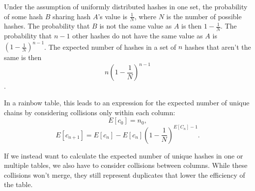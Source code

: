 \documentclass[]{paper}
\begin{document}
Under the assumption of uniformly distributed hashes in one set, the probability of some hash $B$ sharing hash $A$'s value is $\frac{1}{N}$, where $N$ is the number of possible hashes. The probability that $B$ is not the same value as $A$ is then $1 - \frac{1}{N}$. The probability that $n - 1$ other hashes do not have the same value as $A$ is $(1 - \frac{1}{N})^{n - 1}$. The expected number of hashes in a set of $n$ hashes that aren't the same is then
\begin{equation}
n(1 - \frac{1}{N})^{n - 1}
\end{equation}.

In a rainbow table, this leads to an expression for the expected number of unique chains by considering collisions only within each column:
\begin{equation}
E[c_0] = n_0,
\end{equation}
\begin{equation}
E[c_{n+1}] = E[c_n] - E[c_n](1 - \frac{1}{N})^{E[C_n] - 1}.
\end{equation}

If we instead want to calculate the expected number of unique hashes in one or multiple tables, we also have to consider collisions between columns. While these collisions won't merge, they still represent duplicates that lower the efficiency of the table. 
\end{document}
